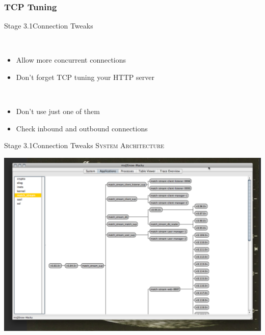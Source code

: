 \documentclass[utf8]{beamer}
\begin{document}
\subsubsection{TCP Tuning}
\begin{frame}{Stage 3.1}{Connection Tweaks}
	\begin{description}
		\item<+->[Backlog]\ \\
			\begin{itemize}
				\item Allow more concurrent connections
				\item Don't forget TCP tuning your HTTP server
			\end{itemize}
		\item<+->[Connections]\ \\
			\begin{itemize}
				\item Don't use just one of them
				\item Check inbound and outbound connections
			\end{itemize}
	\end{description}
\end{frame}
\begin{frame}{Stage 3.1}{Connection Tweaks}
	\textsc{System Architecture}
	\begin{center}
		\includegraphics[height=.75\textheight]{img/running-late.png}
	\end{center}
\end{frame}
\end{document}
